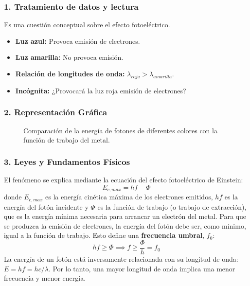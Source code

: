 \subsubsection*{1. Tratamiento de datos y lectura}
Es una cuestión conceptual sobre el efecto fotoeléctrico.
\begin{itemize}
    \item \textbf{Luz azul:} Provoca emisión de electrones.
    \item \textbf{Luz amarilla:} No provoca emisión.
    \item \textbf{Relación de longitudes de onda:} $\lambda_{roja} > \lambda_{amarilla}$.
    \item \textbf{Incógnita:} ¿Provocará la luz roja emisión de electrones?
\end{itemize}

\subsubsection*{2. Representación Gráfica}
\begin{figure}[H]
    \centering
    \caption{Comparación de la energía de fotones de diferentes colores con la función de trabajo del metal.}
\end{figure}

\subsubsection*{3. Leyes y Fundamentos Físicos}
El fenómeno se explica mediante la ecuación del efecto fotoeléctrico de Einstein:
$$ E_{c,max} = hf - \Phi $$
donde $E_{c,max}$ es la energía cinética máxima de los electrones emitidos, $hf$ es la energía del fotón incidente y $\Phi$ es la función de trabajo (o trabajo de extracción), que es la energía mínima necesaria para arrancar un electrón del metal.
Para que se produzca la emisión de electrones, la energía del fotón debe ser, como mínimo, igual a la función de trabajo. Esto define una \textbf{frecuencia umbral}, $f_0$:
$$ hf \ge \Phi \implies f \ge \frac{\Phi}{h} = f_0 $$
La energía de un fotón está inversamente relacionada con su longitud de onda: $E=hf=hc/\lambda$. Por lo tanto, una mayor longitud de onda implica una menor frecuencia y menor energía.

